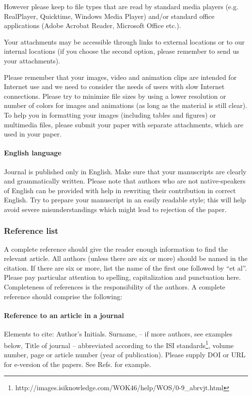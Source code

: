However please keep to file types that are read by standard media players (e.g. RealPlayer, Quicktime, Windows Media Player) and/or standard office applications (Adobe Acrobat Reader, Microsoft Office etc.).

    Your attachments may be accessible through links to external locations or to our internal locations (if you choose the second option, please remember to send us your attachments).

    Please remember that your images, video and animation clips are intended for Internet use and we need to consider the needs of users with slow Internet connections. Please try to minimize file sizes by using a lower resolution or number of colors for images and animations (as long as the material is still clear). To help you in formatting your images (including tables and figures) or multimedia files, please submit your paper with separate attachments, which are used in your paper.

\paragraph{English language}
 Journal     is published only in English. Make sure that your manuscripts are clearly and grammatically written. Please note that authors who are not native-speakers of English can be provided with help in rewriting their contribution in correct English. Try to prepare your manuscript in an easily readable style; this will help avoid severe misunderstandings which might lead to rejection of the paper.

\subsubsection{Reference list}

A complete reference should give the reader enough information to find the relevant article. All authors (unless there are six or more) should be named in the citation. If there are six or more, list the name of the first one followed by ``et al''. Please pay particular attention to spelling, capitalization and punctuation here. Completeness of references is the responsibility of the authors. A complete reference should comprise the following:

\paragraph{Reference to an article in a journal}
Elements to cite:
Author's Initials. Surname, -- if more authors, see examples below,
Title of journal -- abbreviated according to the ISI standards\footnote{ http://images.isiknowledge.com/WOK46/help/WOS/0-9\_abrvjt.html},
volume number, page or article number (year of publication).
Please supply DOI or URL for e-version of the papers.
See Refs. \cite{journal-1, journal-2, journal-3, journal-4, journal-5, journal-6, journal-7, journal-8} for example.

